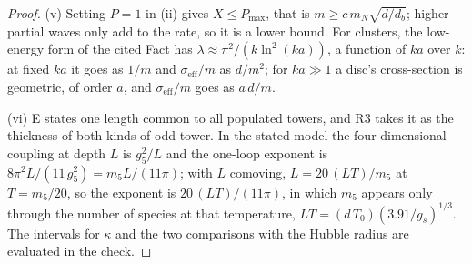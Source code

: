 \begin{proof}
(v) Setting $P = 1$ in (ii) gives $X \le P_{\max}$, that is $m \ge c\,m_{N}\sqrt{d/d_{b}}$; higher partial waves only add to the rate, so it is a lower bound. For clusters, the low-energy form of the cited Fact has $\lambda \approx \pi^{2}/(k\ln^{2}(ka))$, a function of $ka$ over $k$: at fixed $ka$ it goes as $1/m$ and $\sigma_{\mathrm{eff}}/m$ as $d/m^{2}$; for $ka \gg 1$ a disc's cross-section is geometric, of order $a$, and $\sigma_{\mathrm{eff}}/m$ goes as $a\,d/m$.

(vi) E states one length common to all populated towers, and R3 takes it as the thickness of both kinds of odd tower. In the stated model the four-dimensional coupling at depth $L$ is $g_{5}^{2}/L$ and the one-loop exponent is $8\pi^{2}L/(11\,g_{5}^{2}) = m_{5}L/(11\pi)$; with $L$ comoving, $L = 20\,(LT)/m_{5}$ at $T = m_{5}/20$, so the exponent is $20\,(LT)/(11\pi)$, in which $m_{5}$ appears only through the number of species at that temperature, $LT = (d\,T_{0})(3.91/g_{s})^{1/3}$. The intervals for $\kappa$ and the two comparisons with the Hubble radius are evaluated in the check.
\end{proof}
